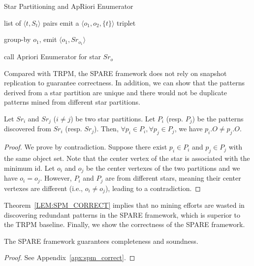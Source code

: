 \begin{algorithm}
\caption{Star Partitioning and ApRiori Enumerator}
\label{algo:spm_overview}
\begin{algorithmic}[1]
\Require list of $\langle t, S_t \rangle$ pairs
\label{code:spm-map-start}
	\State emit a $\langle o_1, o_2, \{t\}\rangle$ triplet~\label{code:spm-edge-direct}
	\EndFor
\EndFor
\label{code:spm-map-end}

\label{code:spm-shuffle-start}
	\State group-by $o_1$, emit $\langle o_1, Sr_{o_1} \rangle$ 
\EndFor
\label{code:spm-shuffle-end}

\label{code:spm-reduce-start}
\State call Apriori Enumerator for star $Sr_o$
\EndFor
\label{code:spm-reduce-end}

\end{algorithmic}
\end{algorithm}

Compared with TRPM, the SPARE framework does not rely on snapshot replication to guarantee correctness. In addition, we can show that the patterns derived from a star partition are unique and there would not be duplicate patterns mined from different star partitions.
\begin{theorem}
\label{LEM:SPM_CORRECT}
Let $Sr_i$ and $Sr_j$ ($i\neq j$) be two star partitions. Let $P_i$ (resp. $P_j$) be 
the patterns discovered from $Sr_i$ (resp. $Sr_j$). 
Then, $\forall p_i \in P_i, \forall p_j \in P_j$, we have $p_i.O \neq p_j.O$.
\end{theorem}
\begin{proof} 
\vspace{-0.5em}
We prove by contradiction. Suppose there exist $p_i \in P_i$ and $p_j \in P_j$ with the same object set. Note that the center vertex of the star is associated with the minimum id. Let $o_i$ and $o_j$ be the center vertexes of the two partitions and we have $o_i=o_j$. However, $P_i$ and $P_j$ are from different stars, meaning their center vertexes are different (i.e., $o_i\neq o_j$), leading to a contradiction. 
\vspace{-0.5em}
\end{proof}

Theorem~\ref{LEM:SPM_CORRECT} implies that no mining efforts are wasted in discovering redundant patterns  
in the SPARE framework, which is superior to the TRPM baseline. Finally, we show the correctness of the SPARE framework.
\begin{theorem}
\label{THM:SPM_CORRECT}
The SPARE framework guarantees completeness and soundness.
\end{theorem}
\begin{proof}  
\vspace{-0.5em}
See Appendix~\ref{apx:spm_correct}.
\vspace{-0.5em}
\end{proof}
